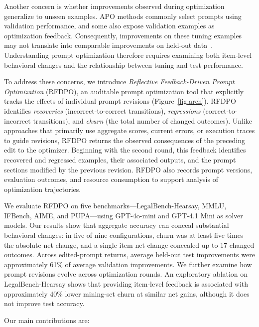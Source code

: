 \documentclass[11pt]{article}
\begin{document}
Another concern is whether improvements observed during optimization generalize to unseen examples. APO methods commonly select prompts using validation performance, and some also expose validation examples as optimization feedback. Consequently, improvements on these tuning examples may not translate into comparable improvements on held-out data~\citep{recht2019imagenet}. Understanding prompt optimization therefore requires examining both item-level behavioral changes and the relationship between tuning and test performance.

To address these concerns, we introduce \emph{Reflective Feedback-Driven Prompt Optimization} (RFDPO), an auditable prompt optimization tool that explicitly tracks the effects of individual prompt revisions (Figure~\ref{fig:arch}). RFDPO identifies \emph{recoveries} (incorrect-to-correct transitions), \emph{regressions} (correct-to-incorrect transitions), and \emph{churn} (the total number of changed outcomes). Unlike approaches that primarily use aggregate scores, current errors, or execution traces to guide revisions, RFDPO returns the observed consequences of the preceding edit to the optimizer. Beginning with the second round, this feedback identifies recovered and regressed examples, their associated outputs, and the prompt sections modified by the previous revision. RFDPO also records prompt versions, evaluation outcomes, and resource consumption to support analysis of optimization trajectories.

We evaluate RFDPO on five benchmarks---LegalBench-Hearsay, MMLU, IFBench, AIME, and PUPA---using GPT-4o-mini and GPT-4.1 Mini as solver models. Our results show that aggregate accuracy can conceal substantial behavioral changes: in five of nine configurations, churn was at least five times the absolute net change, and a single-item net change concealed up to 17 changed outcomes. Across edited-prompt returns, average held-out test improvements were approximately 61\% of average validation improvements. We further examine how prompt revisions evolve across optimization rounds. An exploratory ablation on LegalBench-Hearsay shows that providing item-level feedback is associated with approximately 40\% lower mining-set churn at similar net gains, although it does not improve test accuracy.

Our main contributions are:
\end{document}
